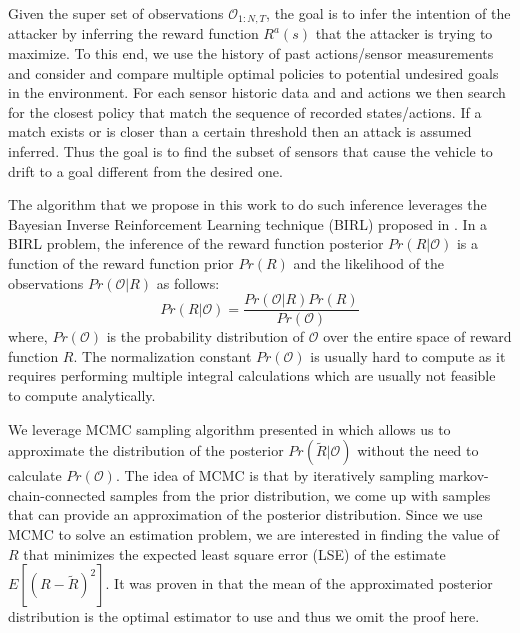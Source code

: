 \documentclass[letterpaper, 10 pt, conference]{ieeeconf}  %
\begin{document}
Given the super set of observations $\mathcal{\mathcal{O}}_{1:N,T}$, the goal is to infer the intention of the attacker by inferring the reward function $R^a (s)$ that the attacker is trying to maximize. To this end, we use the history of past actions/sensor measurements and consider and compare multiple optimal policies to potential undesired goals in the environment. For each sensor historic data and and actions we then search for the closest policy that match the sequence of recorded states/actions. If a match exists or is closer than a certain threshold then an attack is assumed inferred. Thus the goal is to find the subset of sensors that cause the vehicle to drift to a goal different from the desired one.




The algorithm that we propose in this work to do such inference leverages the Bayesian Inverse Reinforcement Learning technique (BIRL) proposed in \cite{Ramachandran2007}. In a BIRL problem, the inference of the reward function posterior $Pr(R|\mathcal{O})$ is a function of the reward function prior $Pr(R)$ and the likelihood of the observations $Pr(\mathcal{O}|R)$ as follows:
\begin{equation} 
    Pr(R|\mathcal{O}) = \frac{Pr(\mathcal{O}|R)Pr(R)}{Pr(\mathcal{O})}
\end{equation}
where, $Pr(\mathcal{O})$ is the probability distribution of $\mathcal{O}$ over the entire space of reward function $R$. The normalization constant $Pr(\mathcal{O})$ is usually hard to compute as it requires performing multiple integral calculations which are usually not feasible to compute analytically. 

We leverage MCMC sampling algorithm presented in \cite{andrieu2003introduction} which allows us to approximate the distribution of the posterior $Pr(\tilde{R}|\mathcal{O})$ without the need to calculate $Pr(\mathcal{O})$. The idea of MCMC is that by iteratively sampling markov-chain-connected samples from the prior distribution, we come up with samples that can provide an approximation of the posterior distribution. Since we use MCMC to solve an estimation problem, we are interested in finding the value of $R$ that minimizes the expected least square error (LSE) of the estimate $E[(R-\tilde{R})^2]$. It was proven in \cite{Ramachandran2007} that the mean of the approximated posterior distribution is the optimal estimator to use and thus we omit the proof here.
\end{document}
